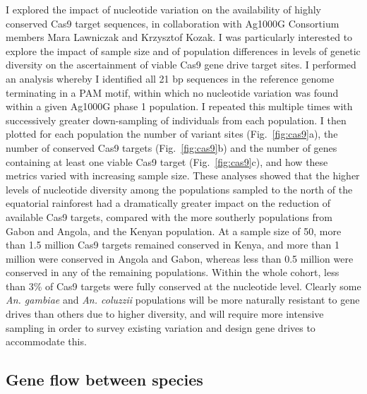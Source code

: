 \documentclass[a4paper,11pt,abstracton,hidelinks]{scrartcl}
\begin{document}
I explored the impact of nucleotide variation on the availability of highly conserved Cas9 target sequences, in collaboration with Ag1000G Consortium members Mara Lawniczak and Krzysztof Kozak.
%
I was particularly interested to explore the impact of sample size and of population differences in levels of genetic diversity on the ascertainment of viable Cas9 gene drive target sites.
%
I performed an analysis whereby I identified all 21 bp sequences in the reference genome terminating in a PAM motif, within which no nucleotide variation was found within a given Ag1000G phase 1 population.
%
I repeated this multiple times with successively greater down-sampling of individuals from each population.
%
I then plotted for each population the number of variant sites (Fig.~\ref{fig:cas9}a), the number of conserved Cas9 targets (Fig.~\ref{fig:cas9}b) and the number of genes containing at least one viable Cas9 target (Fig.~\ref{fig:cas9}c), and how these metrics varied with increasing sample size.
%
These analyses showed that the higher levels of nucleotide diversity among the populations sampled to the north of the equatorial rainforest had a dramatically greater impact on the reduction of available Cas9 targets, compared with the more southerly populations from Gabon and Angola, and the Kenyan population.
%
At a sample size of 50, more than 1.5 million Cas9 targets remained conserved in Kenya, and more than 1 million were conserved in Angola and Gabon, whereas less than 0.5 million were conserved in any of the remaining populations.
%
Within the whole cohort, less than 3\% of Cas9 targets were fully conserved at the nucleotide level.
%
Clearly some \textit{An. gambiae} and \textit{An. coluzzii} populations will be more naturally resistant to gene drives than others due to higher diversity, and will require more intensive sampling in order to survey existing variation and design gene drives to accommodate this.


\subsection{Gene flow between species}\label{subsec:species}



\end{document}
